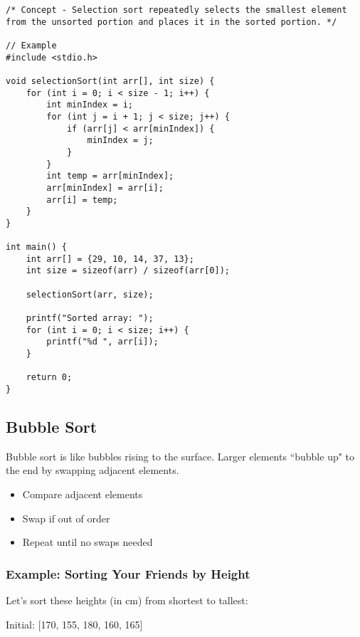 \documentclass[a4paper,12pt]{article}
\begin{document}
\lstset{language=C}
\begin{lstlisting}
/* Concept - Selection sort repeatedly selects the smallest element from the unsorted portion and places it in the sorted portion. */

// Example
#include <stdio.h>

void selectionSort(int arr[], int size) {
    for (int i = 0; i < size - 1; i++) {
        int minIndex = i;
        for (int j = i + 1; j < size; j++) {
            if (arr[j] < arr[minIndex]) {
                minIndex = j;
            }
        }
        int temp = arr[minIndex];
        arr[minIndex] = arr[i];
        arr[i] = temp;
    }
}

int main() {
    int arr[] = {29, 10, 14, 37, 13};
    int size = sizeof(arr) / sizeof(arr[0]);

    selectionSort(arr, size);

    printf("Sorted array: ");
    for (int i = 0; i < size; i++) {
        printf("%d ", arr[i]);
    }

    return 0;
}
\end{lstlisting}

\hrulefill

\newpage

\subsection{Bubble Sort}

Bubble sort is like bubbles rising to the surface. Larger elements ``bubble up" to the end by swapping adjacent elements.

\begin{itemize}
    \item Compare adjacent elements
    \item Swap if out of order
    \item Repeat until no swaps needed
\end{itemize}

\subsubsection{Example: Sorting Your Friends by Height}

Let's sort these heights (in cm) from shortest to tallest:

Initial: [170, 155, 180, 160, 165]
\end{document}
